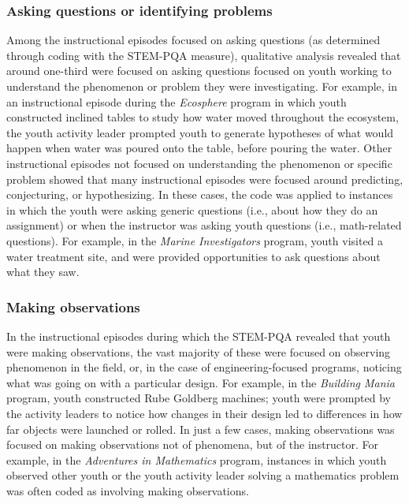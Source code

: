 \documentclass[]{book}
\theoremstyle{definition}
\theoremstyle{definition}
\theoremstyle{definition}
\theoremstyle{remark}
\begin{document}
\subsubsection{Asking questions or identifying
problems}\label{asking-questions-or-identifying-problems}

Among the instructional episodes focused on asking questions (as
determined through coding with the STEM-PQA measure), qualitative
analysis revealed that around one-third were focused on asking questions
focused on youth working to understand the phenomenon or problem they
were investigating. For example, in an instructional episode during the
\emph{Ecosphere} program in which youth constructed inclined tables to
study how water moved throughout the ecosystem, the youth activity
leader prompted youth to generate hypotheses of what would happen when
water was poured onto the table, before pouring the water. Other
instructional episodes not focused on understanding the phenomenon or
specific problem showed that many instructional episodes were focused
around predicting, conjecturing, or hypothesizing. In these cases, the
code was applied to instances in which the youth were asking generic
questions (i.e., about how they do an assignment) or when the instructor
was asking youth questions (i.e., math-related questions). For example,
in the \emph{Marine Investigators} program, youth visited a water
treatment site, and were provided opportunities to ask questions about
what they saw.

\subsubsection{Making observations}\label{making-observations}

In the instructional episodes during which the STEM-PQA revealed that
youth were making observations, the vast majority of these were focused
on observing phenomenon in the field, or, in the case of
engineering-focused programs, noticing what was going on with a
particular design. For example, in the \emph{Building Mania} program,
youth constructed Rube Goldberg machines; youth were prompted by the
activity leaders to notice how changes in their design led to
differences in how far objects were launched or rolled. In just a few
cases, making observations was focused on making observations not of
phenomena, but of the instructor. For example, in the \emph{Adventures
in Mathematics} program, instances in which youth observed other youth
or the youth activity leader solving a mathematics problem was often
coded as involving making observations.
\end{document}
